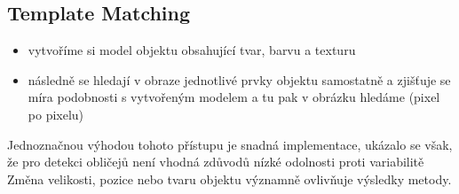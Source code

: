 \subsection{Template Matching}
\begin{itemize}
\item vytvoříme si model objektu obsahující tvar, barvu a texturu 
\item následně se hledají v obraze jednotlivé prvky objektu samostatně a zjišťuje se míra podobnosti s vytvořeným modelem a tu pak v obrázku hledáme (pixel po pixelu)
\end{itemize}
Jednoznačnou výhodou tohoto přístupu je snadná implementace, ukázalo se však, že pro detekci obličejů není vhodná zdůvodů nízké odolnosti proti variabilitě
Změna velikosti, pozice nebo tvaru objektu významně ovlivňuje výsledky metody. 

